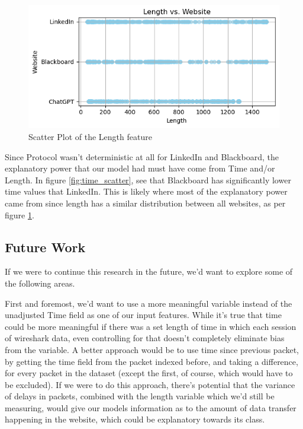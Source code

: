 \documentclass[10pt,sigconf,letterpaper,nonacm]{acmart}
\begin{document}
\begin{figure}
    \centering
    \includegraphics[width=1\linewidth]{Figures_and_Graphs/length_scatter.png}
    \caption{Scatter Plot of the Length feature}
    \label{fig:length_scatter}
\end{figure}

Since Protocol wasn't deterministic at all for LinkedIn and Blackboard, the explanatory power that our model had must have come from Time and/or Length. In figure \ref{fig:time_scatter}, see that Blackboard has significantly lower time values that LinkedIn. 
This is likely where most of the explanatory power came from since length has a similar distribution between all websites, as per figure \ref{fig:length_scatter}.

\subsection{Future Work}

If we were to continue this research in the future, we'd want to explore some of the following areas.

First and foremost, we'd want to use a more meaningful variable instead of the unadjusted Time field as one of our input features. While it's true that time could be more meaningful if there was a set length of time in which each session of wireshark data, even controlling for that doesn't completely eliminate bias from the variable. A better approach would be to use time since previous packet, by getting the time field from the packet indexed before, and taking a difference, for every packet in the dataset (except the first, of course, which would have to be excluded). If we were to do this approach, there's potential that the variance of delays in packets, combined with the length variable which we'd still be measuring, would give our models information as to the amount of data transfer happening in the website, which could be explanatory towards its class.
\end{document}

